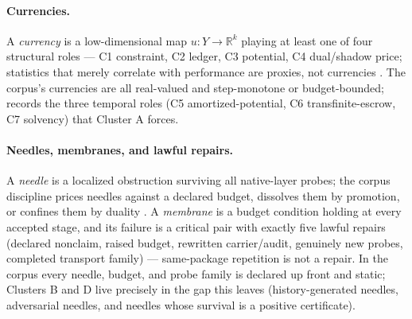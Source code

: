 \documentclass[11pt]{article}
\theoremstyle{definition}
\begin{document}
\paragraph{Currencies.} A \emph{currency} is a low-dimensional map $u : Y \to \mathbb{R}^k$ playing
at least one of four structural roles --- C1 constraint, C2 ledger, C3 potential, C4 dual/shadow
price; statistics that merely correlate with performance are proxies, not currencies
\citep{Tsiokos2026Currency}. The corpus's currencies are all real-valued and step-monotone or
budget-bounded;  records the three temporal roles (C5 amortized-potential,
C6 transfinite-escrow, C7 solvency) that Cluster A forces.

\paragraph{Needles, membranes, and lawful repairs.} A \emph{needle} is a localized obstruction
surviving all native-layer probes; the corpus discipline prices needles against a declared budget,
dissolves them by promotion, or confines them by duality \citep{Tsiokos2026NeedleKiller}. A
\emph{membrane} is a budget condition holding at every accepted stage, and its failure is a critical
pair with exactly five lawful repairs (declared nonclaim, raised budget, rewritten carrier/audit,
genuinely new probes, completed transport family) --- same-package repetition is not a repair. In the
corpus every needle, budget, and probe family is declared up front and static; Clusters B and D live
precisely in the gap this leaves (history-generated needles, adversarial needles, and needles whose
survival is a positive certificate).
\end{document}
